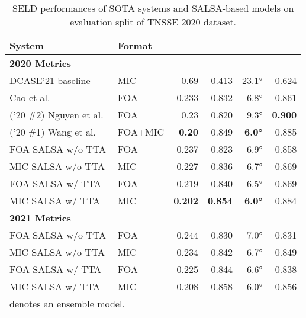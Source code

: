 \documentclass[journal]{IEEEtran}
\newcommand{\etalcite}[1]{ et al.~\cite{#1}}
\begin{document}
\begin{table}[t] \small

    \centering
    \caption{SELD performances of SOTA systems and SALSA-based models on evaluation split of TNSSE 2020 dataset.}
    \setlength{\tabcolsep}{3pt}
    \footnotesize
    \noindent\begin{tabularx}{\columnwidth}{Xlrrrr}
    \toprule 
        System
        & Format
        &  
        & 
        & 
        &  \\
    \midrule
    \bfseries 2020 Metrics \\
        DCASE'21 baseline~\cite{Politis2020ADetection}
            & MIC & 0.69\hphantom{0} & 0.413 & 23.1\si{\degree} & 0.624 \\
        Cao\etalcite{Cao2021AnDetection}
            & FOA & 0.233 & 0.832 & 6.8\si{\degree} & 0.861 \\
        ('20 \#2) Nguyen\etalcite{Nguyen2020EnsembleTracking}   
            & FOA & 0.23\hphantom{0} & 0.820 & 9.3\si{\degree} & \bf{0.900} \\
        ('20 \#1) Wang\etalcite{Wang2020TheChallenge}  
            & FOA+MIC & \bf{0.20\hphantom{0}} & 0.849 & \bf{6.0\si{\degree}} & 0.885 \\
    \midrule
        FOA SALSA w/o TTA
            & FOA & 0.237 & 0.823 & 6.9\si{\degree} & 0.858 \\
        MIC SALSA w/o TTA
            & MIC & 0.227 & 0.836 & 6.7\si{\degree} & 0.869 \\ 
        FOA SALSA w/ TTA
            & FOA & 0.219 & 0.840 & 6.5\si{\degree} & 0.869 \\
        MIC SALSA w/ TTA
            & MIC & \bf{0.202} & \bf{0.854} & \bf{6.0\si{\degree}} & 0.884 \\
    \midrule
    \midrule
    \bfseries 2021 Metrics \\
        FOA SALSA w/o TTA
            & FOA & 0.244 & 0.830 & 7.0\si{\degree} & 0.831 \\
        MIC SALSA w/o TTA
            & MIC & 0.234 & 0.842 & 6.7\si{\degree} & 0.849 \\ 
        FOA SALSA w/ TTA
            & FOA & 0.225 & 0.844 & 6.6\si{\degree} & 0.838 \\
        MIC SALSA w/ TTA
            & MIC & 0.208 & 0.858 & 6.0\si{\degree} & 0.856 \\
    \bottomrule
    \multicolumn{2}{l}{ denotes an ensemble model.}
    \end{tabularx}
    \label{tab:sota_2020_eval}
\end{table}
\end{document}
